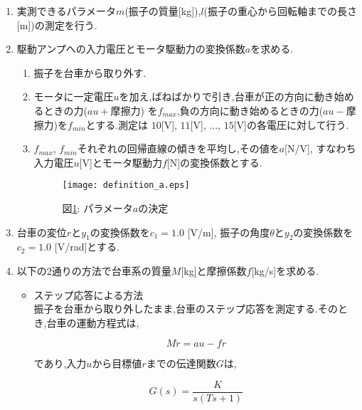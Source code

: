 \begin{enumerate}
    \item 実測できるパラメータ$m$(振子の質量[kg]),$l$(振子の重心から回転軸までの長さ[m])の測定を行う.
    \item 駆動アンプへの入力電圧とモータ駆動力の変換係数$a$を求める.
    \begin{enumerate}
        \item 振子を台車から取り外す.
        \item モータに一定電圧$u$を加え,ばねばかりで引き,台車が正の方向に動き始めるときの力($au+$摩擦力)
        を$f_{max}$,負の方向に動き始めるときの力($au-$摩擦力)を$f_{min}$とする.測定は
        $10$[V], $11$[V], ..., $15$[V]の各電圧に対して行う.
        \item $f_{max}$, $f_{min}$それぞれの回帰直線の傾きを平均し,その値を$a$[N/V],
        すなわち入力電圧$u$[V]とモータ駆動力$f$[N]の変換係数とする.
        \begin{figure}[htbp]
            \begin{center}
                \texttt{[image: definition\_a.eps]}
                \caption{図\ref{definition_a}: パラメータ$a$の決定}
                \label{definition_a}
            \end{center}
        \end{figure}
    \end{enumerate}

    \item 台車の変位$r$と$y_{1}$の変換係数を$c_{1} = 1.0$ [V/m], 
    振子の角度$\theta$と$y_{2}$の変換係数を$c_{2} = 1.0$ [V/rad]とする.

    \item 以下の2通りの方法で台車系の質量$M$[kg]と摩擦係数$f$[kg/s]を求める.
    \begin{itemize}
        \item ステップ応答による方法　\\
        \quad 振子を台車から取り外したまま,台車のステップ応答を測定する.そのとき,台車の運動方程式は,

        \begin{equation}
            M \ddot r = au - fr
            \label{eq_model}
        \end{equation}

        であり,入力$u$から目標値$r$までの伝達関数$G$は,

        \begin{equation}
            G(s) = \frac{K}{s(Ts + 1)}
        \end{equation}


\end{itemize}
\end{enumerate}
